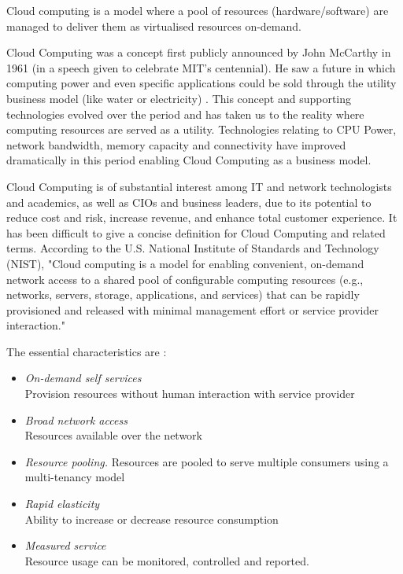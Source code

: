 \documentclass[12pt,a4paper]{report}
\begin{document}
Cloud computing is a model where a pool of resources (hardware/software) are
managed to deliver them as virtualised resources on-demand.


Cloud Computing was a concept first publicly announced by John McCarthy in 1961 
(in a speech given to celebrate MIT's centennial). He saw a future in which computing 
power and even specific applications could be sold through the utility 
business model (like water or electricity) \cite{garfinkel1999architects} .
This concept and  supporting technologies evolved over the period and has taken us 
to the reality where computing resources are served as a utility. 
Technologies relating to CPU Power, network bandwidth, memory capacity 
and connectivity have improved dramatically in this period enabling Cloud Computing as 
a business model.

Cloud Computing is of substantial interest among IT and network technologists
and academics, as well as CIOs and business leaders, due to its potential to 
reduce cost and risk, increase revenue, and enhance total customer experience.\cite{weinman2011future}
It has been difficult to give a concise definition for Cloud Computing 
and related terms. According to the U.S. National Institute of Standards 
and Technology (NIST), \cite{mell2009nist}  "Cloud computing is a model for enabling convenient,
on-demand network access to a shared pool of configurable computing resources
(e.g., networks, servers, storage, applications, and services) that can 
be rapidly provisioned and released with minimal management 
effort or service provider interaction." 

The essential characteristics are \cite{mell2009nist} :

\begin{itemize}
  \item \emph{On-demand self services} \\ Provision resources without human
     interaction with service provider
  \item \emph{Broad network access} \\Resources available over the network
  \item \emph{Resource pooling.} Resources are pooled to serve multiple 
        consumers using a multi-tenancy model
  \item \emph{Rapid elasticity} \\Ability to increase or decrease resource consumption
  \item \emph{Measured service} \\Resource usage can be monitored, controlled and reported.
\end{itemize}
\end{document}
